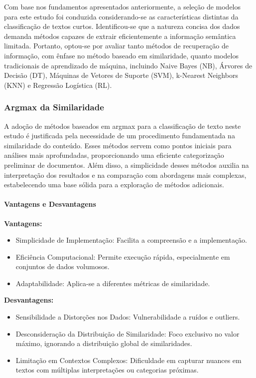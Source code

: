 Com base nos fundamentos apresentados anteriormente, a seleção de modelos para este estudo foi conduzida considerando-se as características distintas da classificação de textos curtos. Identificou-se que a natureza concisa dos dados demanda métodos capazes de extrair eficientemente a informação semântica limitada. Portanto, optou-se por avaliar tanto métodos de recuperação de informação, com ênfase no método baseado em similaridade, quanto modelos tradicionais de aprendizado de máquina, incluindo Naive Bayes (NB), Árvores de Decisão (DT), Máquinas de Vetores de Suporte (SVM), k-Nearest Neighbors (KNN) e Regressão Logística (RL).

\subsubsection{Argmax da Similaridade}

A adoção de métodos baseados em argmax para a classificação de texto neste estudo é justificada pela necessidade de um procedimento fundamentada na similaridade do conteúdo. Esses métodos servem como pontos iniciais para análises mais aprofundadas, proporcionando uma eficiente categorização preliminar de documentos. Além disso, a simplicidade desses métodos auxilia na interpretação dos resultados e na comparação com abordagens mais complexas, estabelecendo uma base sólida para a exploração de métodos adicionais.

\paragraph{Vantagens e Desvantagens}
\textbf{Vantagens:}
\begin{itemize}
    \item Simplicidade de Implementação: Facilita a compreensão e a implementação.
    \item Eficiência Computacional: Permite execução rápida, especialmente em conjuntos de dados volumosos.
    \item Adaptabilidade: Aplica-se a diferentes métricas de similaridade.
\end{itemize}

\textbf{Desvantagens:}
\begin{itemize}
    \item Sensibilidade a Distorções nos Dados: Vulnerabilidade a ruídos e outliers.
    \item Desconsideração da Distribuição de Similaridade: Foco exclusivo no valor máximo, ignorando a distribuição global de similaridades.
    \item Limitação em Contextos Complexos: Dificuldade em capturar nuances em textos com múltiplas interpretações ou categorias próximas.
\end{itemize}

